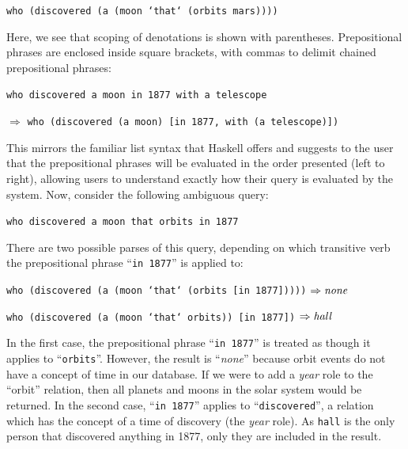 \documentclass[../main.tex]{subfiles}
\begin{document}
\begin{refsection}
\examplespacing

\texttt{who (discovered (a (moon `that` (orbits mars))))}

\examplespacing

\noindent Here, we see that scoping of denotations is shown with parentheses.  Prepositional phrases are enclosed inside square brackets, with commas to delimit chained prepositional phrases:

\examplespacing

\texttt{who discovered a moon in 1877 with a telescope}

\qquad $\Rightarrow$ \texttt{who (discovered (a moon) [in 1877, with (a telescope)])}

\examplespacing

\noindent This mirrors the familiar list syntax that Haskell offers and suggests to the user that the prepositional phrases will be evaluated in the order presented (left to right), allowing users to understand exactly how their query is evaluated by the system. Now, consider the following ambiguous query:

\examplespacing

\texttt{who discovered a moon that orbits in 1877}

\examplespacing

\noindent There are two possible parses of this query, depending on which transitive verb the prepositional phrase ``\texttt{in 1877}'' is applied to:

\examplespacing

\texttt{who (discovered (a (moon `that` (orbits [in 1877]))))} $\Rightarrow \operatorname{\mathit{none}}$

\texttt{who (discovered (a (moon `that` orbits)) [in 1877])} $\Rightarrow  \operatorname{\mathit{hall}}$

\examplespacing

\noindent In the first case, the prepositional phrase ``\texttt{in 1877}'' is treated as though it applies to ``\texttt{orbits}''.  However, the result is ``\textit{none}'' because orbit events do not have a concept of time in our database.  If we were to add a \textit{year} role to the ``orbit'' relation, then all planets and moons in the solar system would be returned.
In the second case, ``\texttt{in 1877}'' applies to ``\texttt{discovered}'', a relation which has the concept of a time of discovery (the \textit{year} role).  As \texttt{hall} is the only person that discovered anything in 1877, only they are included in the result.


\end{refsection}
\end{document}
